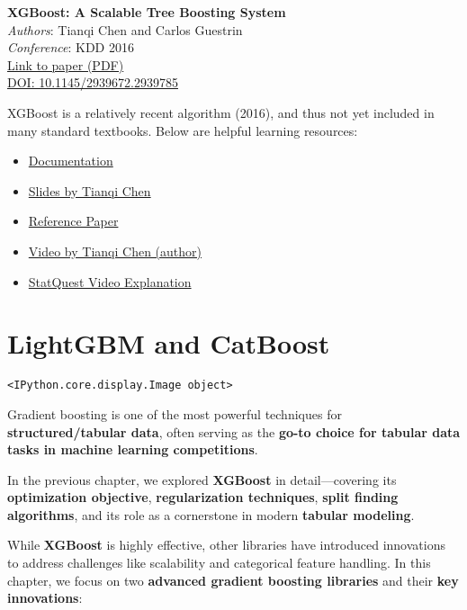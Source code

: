 \documentclass[
  letterpaper,
  DIV=11,
  numbers=noendperiod]{scrreprt}
\providecommand{\tightlist}{%
  \setlength{\itemsep}{0pt}\setlength{\parskip}{0pt}}\usepackage{longtable,booktabs,array}
\begin{document}
\textbf{XGBoost: A Scalable Tree Boosting System}\\
\emph{Authors}: Tianqi Chen and Carlos Guestrin\\
\emph{Conference}: KDD 2016\\
\href{https://arxiv.org/abs/1603.02754}{Link to paper (PDF)}\\
\href{https://doi.org/10.1145/2939672.2939785}{DOI:
10.1145/2939672.2939785}

XGBoost is a relatively recent algorithm (2016), and thus not yet
included in many standard textbooks. Below are helpful learning
resources:

\begin{itemize}
\tightlist
\item
  \href{https://xgboost.readthedocs.io/en/stable/python/python_api.html}{Documentation}
\item
  \href{https://files.speakerdeck.com/presentations/5c6dab45648344208185d2b1ab4fdc95/XGBoost-Newest.pdf}{Slides
  by Tianqi Chen}
\item
  \href{https://dl.acm.org/doi/pdf/10.1145/2939672.2939785}{Reference
  Paper}
\item
  \href{https://www.youtube.com/watch?v=Vly8xGnNiWs}{Video by Tianqi
  Chen (author)}
\item
  \href{https://www.youtube.com/watch?v=OtD8wVaFm6E}{StatQuest Video
  Explanation}
\end{itemize}

\chapter{LightGBM and CatBoost}\label{lightgbm-and-catboost}

\begin{verbatim}
<IPython.core.display.Image object>
\end{verbatim}

Gradient boosting is one of the most powerful techniques for
\textbf{structured/tabular data}, often serving as the \textbf{go-to
choice for tabular data tasks in machine learning competitions}.

In the previous chapter, we explored \textbf{XGBoost} in
detail---covering its \textbf{optimization objective},
\textbf{regularization techniques}, \textbf{split finding algorithms},
and its role as a cornerstone in modern \textbf{tabular modeling}.

While \textbf{XGBoost} is highly effective, other libraries have
introduced innovations to address challenges like scalability and
categorical feature handling. In this chapter, we focus on two
\textbf{advanced gradient boosting libraries} and their \textbf{key
innovations}:
\end{document}
